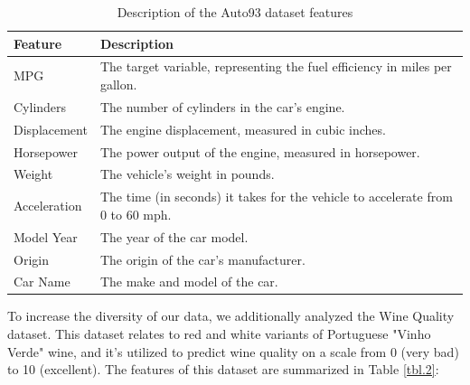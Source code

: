 \documentclass{ieeeaccess}
\begin{document}
    \begin{table}[h!]
        \centering
        \begin{tabular}{|>{\raggedright\arraybackslash}p{3cm}|>{\raggedright\arraybackslash}p{9cm}|}
        \hline
        \textbf{Feature} & \textbf{Description} \\
        \hline
        MPG & The target variable, representing the fuel efficiency in miles per gallon. \\
        \hline
        Cylinders & The number of cylinders in the car's engine. \\
        \hline
        Displacement & The engine displacement, measured in cubic inches. \\
        \hline
        Horsepower & The power output of the engine, measured in horsepower. \\
        \hline
        Weight & The vehicle's weight in pounds. \\
        \hline
        Acceleration & The time (in seconds) it takes for the vehicle to accelerate from 0 to 60 mph. \\
        \hline
        Model Year & The year of the car model. \\
        \hline
        Origin & The origin of the car's manufacturer. \\
        \hline
        Car Name & The make and model of the car. \\
        \hline
        \end{tabular}
        \caption{Description of the Auto93 dataset features}
        \label{tbl.1}
        \end{table}

        To increase the diversity of our data, we additionally analyzed the Wine Quality dataset. This dataset relates to red and white variants of Portuguese "Vinho Verde" wine, and it's utilized to predict wine quality on a scale from 0 (very bad) to 10 (excellent)\cite{cortez2009}. The features of this dataset are summarized in Table \ref{tbl.2}:
\end{document}
